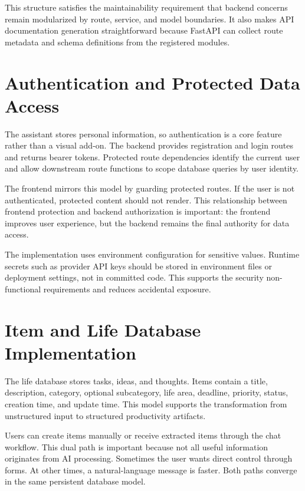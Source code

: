 This structure satisfies the maintainability requirement that backend concerns remain modularized by route, service, and model boundaries. It also makes API documentation generation straightforward because FastAPI can collect route metadata and schema definitions from the registered modules.

\section{Authentication and Protected Data Access}

The assistant stores personal information, so authentication is a core feature rather than a visual add-on. The backend provides registration and login routes and returns bearer tokens. Protected route dependencies identify the current user and allow downstream route functions to scope database queries by user identity.

The frontend mirrors this model by guarding protected routes. If the user is not authenticated, protected content should not render. This relationship between frontend protection and backend authorization is important: the frontend improves user experience, but the backend remains the final authority for data access.

The implementation uses environment configuration for sensitive values. Runtime secrets such as provider API keys should be stored in environment files or deployment settings, not in committed code. This supports the security non-functional requirements and reduces accidental exposure.

\section{Item and Life Database Implementation}

The life database stores tasks, ideas, and thoughts. Items contain a title, description, category, optional subcategory, life area, deadline, priority, status, creation time, and update time. This model supports the transformation from unstructured input to structured productivity artifacts.

Users can create items manually or receive extracted items through the chat workflow. This dual path is important because not all useful information originates from AI processing. Sometimes the user wants direct control through forms. At other times, a natural-language message is faster. Both paths converge in the same persistent database model.

